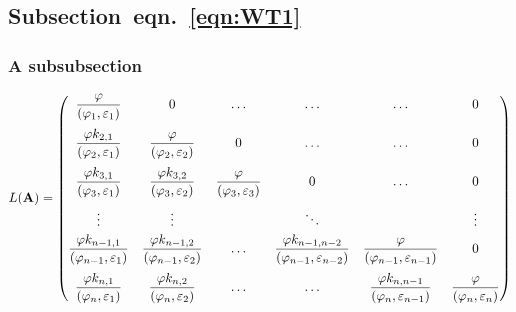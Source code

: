
\subsection[Subsection~eqn.~(\ref*{eqn:WT1})]{Subsection~eqn.~\eqref{eqn:WT1}}

\subsubsection{A subsubsection}

\newcommand*{\boldA}{\ifpdftex\mathbf{A}\else\symbfup{A}\fi}%

\begin{equation}\label{eqn:WT1}
L(\boldA) = \begin{pmatrix}
\dfrac\varphi{(\varphi_1,\varepsilon_1)}			& 0 												 & \ldots 									& \ldots & \ldots& 0 \\[4\jot]
\dfrac{\varphi k_{2,1}}{(\varphi_2,\varepsilon_1)}	& \dfrac\varphi{(\varphi_2,\varepsilon_2)}			 & 0 										& \ldots & \ldots& 0 \\[4\jot]
\dfrac{\varphi k_{3,1}}{(\varphi_3,\varepsilon_1)}	& \dfrac{\varphi k_{3,2}}{(\varphi_3,\varepsilon_2)} & \dfrac\varphi{(\varphi_3,\varepsilon_3)}	& 0 	 & \ldots& 0 \\[4\jot]
\vdots 												& \vdots 											 & \mbox{ } & \ddots & \mbox{ } & \vdots \\[\jot]
\dfrac{\varphi k_{n-1, 1}}{(\varphi_{n-1},\varepsilon_1)}		& \dfrac{\varphi k_{n-1, 2}}{(\varphi_{n-1},\varepsilon_2)} & \ldots & 
\dfrac{\varphi k_{n-1,n-2}}{(\varphi_{n-1},\varepsilon_{n-2})}	& \dfrac{\varphi}{(\varphi_{n-1},\varepsilon_{n-1})} 		& 0 \\[4\jot]
\dfrac{\varphi k_{n,1}}{(\varphi_n,\varepsilon_1)}				& \dfrac{\varphi k_{n,2}}{(\varphi_n,\varepsilon_2)}		& \ldots & \ldots	&
\dfrac{\varphi k_{n,n-1}}{(\varphi_n,\varepsilon_{n-1})} 		& \dfrac{\varphi}{(\varphi_n,\varepsilon_n)}
\end{pmatrix}
\end{equation}

